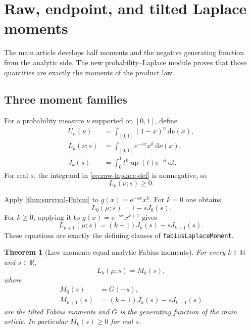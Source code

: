 \documentclass[11pt,oneside]{article}
\newtheorem{theorem}{Theorem}[section]
\theoremstyle{definition}
\theoremstyle{remark}
\newcommand{\R}{\mathbb R}
\newcommand{\N}{\mathbb N}
\newcommand{\Up}{\operatorname{up}}
\newcommand{\e}{\mathrm e}
\newcommand{\dd}{\,\mathrm d}
\newcommand{\lean}[1]{\texttt{#1}}
\begin{document}
\section{Raw, endpoint, and tilted Laplace moments}
\label{sec:probability-laplace}

The main article develops half moments and the negative generating function from the
analytic side.  The new probability--Laplace module proves that those quantities are exactly
the moments of the product law.

\subsection{Three moment families}

For a probability measure $\nu$ supported on $[0,1]$, define
\begin{align}
 U_n(\nu)&=\int_{[0,1]}(1-x)^n\dd\nu(x),                  \label{eq:endpoint-moment-def}\\
 L_k(\nu;s)&=\int_{[0,1]}\e^{-sx}x^k\dd\nu(x),           \label{eq:raw-laplace-def}\\
 J_k(s)&=\int_0^1t^k\Up(t)\e^{-st}\dd t.                 \label{eq:survival-tilt-def}
\end{align}
For real $s$, the integrand in \eqref{eq:raw-laplace-def} is nonnegative, so
\begin{equation}
 L_k(\nu;s)\ge0.
 \label{eq:laplace-moment-nonnegative}
\end{equation}

Apply \cref{thm:survival-Fubini} to $g(x)=\e^{-sx}x^k$.  For $k=0$ one obtains
\begin{equation}
 L_0(\mu;s)=1-sJ_0(s).
 \label{eq:laplace-zero-survival}
\end{equation}
For $k\ge0$, applying it to $g(x)=\e^{-sx}x^{k+1}$ gives
\begin{equation}
 L_{k+1}(\mu;s)=(k+1)J_k(s)-sJ_{k+1}(s).
 \label{eq:laplace-successor-survival}
\end{equation}
These equations are exactly the defining clauses of
\lean{fabiusLaplaceMoment}.

\begin{theorem}[Law moments equal analytic Fabius moments]
\label{thm:law-moments-identification}
For every $k\in\N$ and $s\in\R$,
\begin{equation}
 L_k(\mu;s)=M_k(s),
 \label{eq:law-M-identification}
\end{equation}
where
\begin{align}
 M_0(s)&=G(-s),                                            \label{eq:M-zero}\\
 M_{k+1}(s)&=(k+1)J_k(s)-sJ_{k+1}(s)                      \label{eq:M-successor}
\end{align}
are the tilted Fabius moments and $G$ is the generating function of the main article.
In particular $M_k(s)\ge0$ for real $s$.
\end{theorem}
\end{document}
